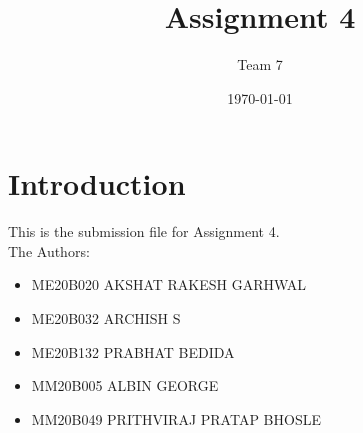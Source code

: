 \documentclass[12pt,a4paper]{article}
\begin{document}
\title{Assignment 4}
\author{Team 7}
\date{\today}
\maketitle

\tableofcontents
\listoffigures	
\section{Introduction}
This is the submission file for Assignment 4. \\
The Authors:
\begin{itemize}
	\item ME20B020 AKSHAT RAKESH GARHWAL
	\item ME20B032 ARCHISH S
	\item ME20B132 PRABHAT BEDIDA
	\item MM20B005 ALBIN GEORGE
	\item MM20B049 PRITHVIRAJ PRATAP BHOSLE
\end{itemize}





 
\end{document}
